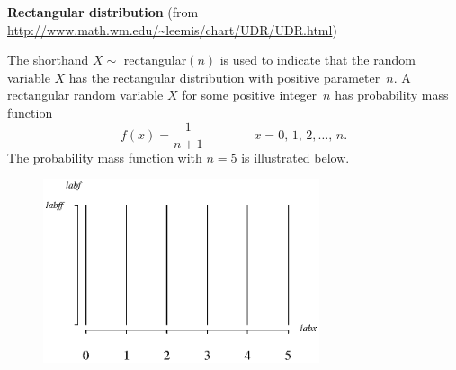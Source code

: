 \documentclass[12pt,fullpage]{article}
\begin{document}
\noindent
{\bf Rectangular distribution} (from \color{blue}\url{http://www.math.wm.edu/~leemis/chart/UDR/UDR.html}\color{black})

\noindent
The shorthand $X \sim$ rectangular$(n)$ is used to indicate that the
random variable $X$ has the rectangular distribution with positive parameter~$n$.
A rectangular random variable $X$ for some positive integer~$n$ has probability mass function 
$$
f(x) = \frac{1}{n + 1} \qquad \qquad x = 0,\, 1,\, 2, \ldots,\,n.
$$
The probability mass function with $n = 5$ is illustrated below.
{\begin{figure}[h!]
\begin{center}
\includegraphics[width=3.2in]{RectangularPlot.ps}
\end{center}
\end{figure}}
\end{document}
